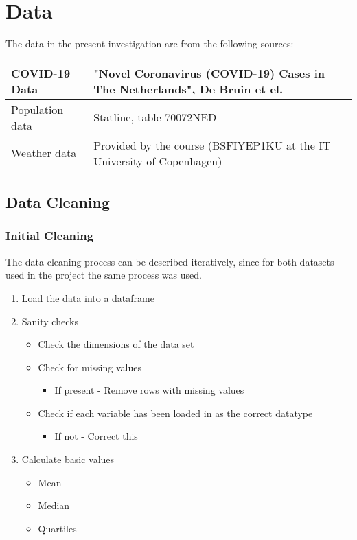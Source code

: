 \section{Data}
The data in the present investigation are from the following sources: 
\begin{table}[h!]
    \begin{tabular}{|p{}|p{}|}
        \hline 
        COVID-19 Data & "Novel Coronavirus (COVID-19) Cases in The Netherlands", De Bruin et el. \citep{DeBruin2020} \\ \hline 
        Population data & Statline, table 70072NED \\ \hline 
        Weather data & Provided by the course (BSFIYEP1KU at the IT University of Copenhagen) \\ \hline 
    \end{tabular}
\end{table}

\subsection{Data Cleaning}
\subsubsection{Initial Cleaning}
The data cleaning process can be described iteratively, since for both datasets used in the project the same process was used. 

\begin{enumerate}
    \item Load the data into a dataframe 
    \item Sanity checks 
    \begin{itemize}
        \item Check the dimensions of the data set 
        \item Check for missing values 
        \begin{itemize}
            \item If present - Remove rows with missing values
        \end{itemize}
        \item Check if each variable has been loaded in as the correct datatype 
        \begin{itemize}
            \item If not - Correct this 
        \end{itemize}
    \end{itemize}
    \item Calculate basic values 
    \begin{itemize}
        \item Mean 
        \item Median 
        \item Quartiles 
    \end{itemize}

\end{enumerate}

